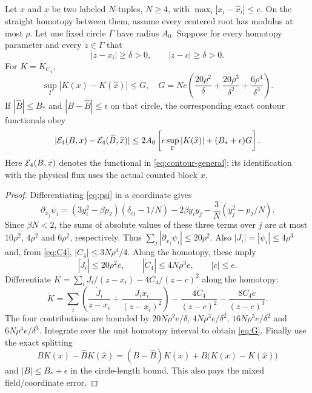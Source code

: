 \begin{proposition}
\label{prop:coordinates}
Let $x$ and $\widehat x$ be two labeled $N$-tuples, $N\ge4$, with
$\max_i|x_i-\widehat x_i|\le e$. On the straight homotopy between
them, assume every centered root has modulus at most $\rho$.
Let one fixed circle $\Gamma$ have radius $A_0$. Suppose for every
homotopy parameter and every $z\in\Gamma$ that
\begin{equation}
 |z-x_i|\ge\delta>0,\qquad |z-c|\ge\delta>0.
 \label{eq:coordinate-clearance}
\end{equation}
For $K=K_{C_4}$,
\begin{equation}
 \sup_\Gamma|K(x)-K(\widehat x)|\le G,
 \quad
 G=Ne\left(\frac{20\rho^2}{\delta}
          +\frac{20\rho^3}{\delta^2}
          +\frac{6\rho^4}{\delta^3}\right).
 \label{eq:G}
\end{equation}
If $|\widehat B|\le B_*$ and $|B-\widehat B|\le\epsilon$ on
that circle, the corresponding exact contour functionals obey
\begin{equation}
 |\mathcal E_4(B,x)-\mathcal E_4(\widehat B,\widehat x)|
 \le 2A_0\left[\epsilon\sup_\Gamma|K(\widehat x)|
                         +(B_*+\epsilon)G\right].
 \label{eq:joint-coordinate}
\end{equation}
Here $\mathcal E_4(B,x)$ denotes the functional in
\eqref{eq:contour-general}; its identification with the physical
flux uses the actual counted block $x$.
\end{proposition}
\begin{proof}
Differentiating \eqref{eq:psi} in a coordinate gives
\begin{equation}
 \partial_{x_j}\psi_i
  =(3y_i^2-\beta p_2)(\delta_{ij}-1/N)
       -2\beta y_i y_j-\frac3N(y_j^2-p_2/N).
 \label{eq:psi-jacobian}
\end{equation}
Since $\beta N<2$, the sums of absolute values of these three
terms over $j$ are at most $10\rho^2$, $4\rho^2$ and
$6\rho^2$, respectively. Thus
$\sum_j|\partial_{x_j}\psi_i|\le20\rho^2$.
Also $|J_i|=|\psi_i|\le4\rho^3$ and, from \eqref{eq:C4},
$|C_4|\le3N\rho^4/4$. Along the homotopy, these imply
\[
 |\dot J_i|\le20\rho^2 e,\qquad
 |\dot C_4|\le4N\rho^3 e,\qquad |\dot c|\le e.
\]
Differentiate
$K=\sum_iJ_i/(z-x_i)-4C_4/(z-c)^2$ along the homotopy:
\[
 \dot K=\sum_i\left(\frac{\dot J_i}{z-x_i}
                       +\frac{J_i\dot x_i}{(z-x_i)^2}\right)
       -\frac{4\dot C_4}{(z-c)^2}
       -\frac{8C_4\dot c}{(z-c)^3}.
\]
The four contributions are bounded by
$20N\rho^2e/\delta$, $4N\rho^3e/\delta^2$,
$16N\rho^3e/\delta^2$ and $6N\rho^4e/\delta^3$.
Integrate over the unit homotopy interval to obtain \eqref{eq:G}.
Finally use the exact splitting
\[
 BK(x)-\widehat B K(\widehat x)
  =(B-\widehat B)K(\widehat x)+B\bigl(K(x)-K(\widehat x)\bigr)
\]
and $|B|\le B_*+\epsilon$ in the circle-length bound. This also
pays the mixed field/coordinate error.
\end{proof}

